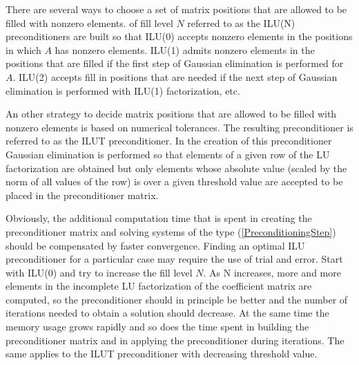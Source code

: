 \begin{versiona}
There are several ways to choose a set of matrix positions that are allowed to be filled 
with nonzero elements.  of fill level $N$ referred to 
as the ILU(N) preconditioners are built so that ILU(0) accepts nonzero elements in the positions 
in which $A$ has nonzero elements. ILU(1) admits nonzero elements in the positions that are 
filled if the first step of Gaussian elimination is performed for $A$. 
ILU(2) accepts fill in positions that are needed if the next step of Gaussian 
elimination is performed with ILU(1) factorization, etc.    

An other strategy to decide matrix positions that are allowed to be filled 
with nonzero elements is based on numerical tolerances. The resulting preconditioner is 
referred to as the ILUT preconditioner. In the creation of this preconditioner   
Gaussian elimination is performed so that elements of a given
row of the LU factorization are obtained but only elements whose absolute
value (scaled by the norm of all values of the row) is over a given threshold value 
are accepted to be placed in the preconditioner matrix.

Obviously, the additional computation time that is spent in creating the preconditioner
matrix and solving systems of the type (\ref{PreconditioningStep}) 
should be compensated by faster convergence. Finding an optimal ILU preconditioner for
a particular case may require the use of trial and error. Start with ILU(0) and 
try to increase the fill level $N$. 
As N increases, more and more elements in the incomplete LU factorization of the coefficient 
matrix are computed, so the preconditioner should in principle be better and the number of iterations 
needed to obtain a solution should decrease. At the same time the memory usage grows rapidly and 
so does the time spent 
in building the preconditioner matrix and in applying the preconditioner during iterations. 
The same applies to the ILUT preconditioner with decreasing threshold value.  
      


\end{versiona}
